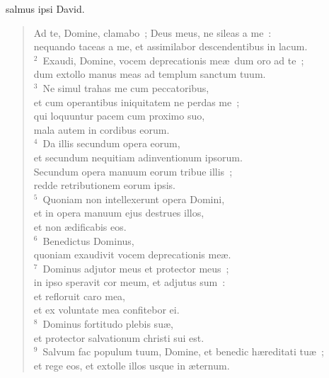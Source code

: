 


\bchapter
{}salmus ipsi David. \begin{flushleft}\begin{verse}\vspace{6pt}Ad te, Domine, clamabo~; Deus meus, ne sileas a me~:\\ nequando taceas a me, et assimilabor descendentibus in lacum.\\
${}^{2}$~Exaudi, Domine, vocem deprecationis me\ae\ dum oro ad te~;\\ dum extollo manus meas ad templum sanctum tuum.\\
${}^{3}$~Ne simul trahas me cum peccatoribus,\\ et cum operantibus iniquitatem ne perdas me~;\\ qui loquuntur pacem cum proximo suo,\\ mala autem in cordibus eorum.\\
${}^{4}$~Da illis secundum opera eorum,\\ et secundum nequitiam adinventionum ipsorum.\\ Secundum opera manuum eorum tribue illis~;\\ redde retributionem eorum ipsis.\\
${}^{5}$~Quoniam non intellexerunt opera Domini,\\ et in opera manuum ejus destrues illos,\\ et non \ae dificabis eos.\\
${}^{6}$~Benedictus Dominus,\\ quoniam exaudivit vocem deprecationis me\ae .\\
${}^{7}$~Dominus adjutor meus et protector meus~;\\ in ipso speravit cor meum, et adjutus sum~:\\ et refloruit caro mea,\\ et ex voluntate mea confitebor ei.\\
${}^{8}$~Dominus fortitudo plebis su\ae ,\\ et protector salvationum christi sui est.\\
${}^{9}$~Salvum fac populum tuum, Domine, et benedic h\ae reditati tu\ae~;\\ et rege eos, et extolle illos usque in \ae ternum.\end{verse}\end{flushleft}



